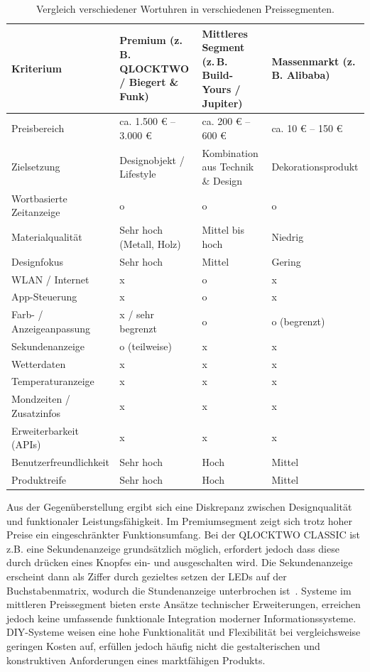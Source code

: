 \begin{table}[h]
\centering
\begin{tabular}{|p{4cm}|p{3.5cm}|p{3.5cm}|p{3.5cm}|}
\hline
\textbf{Kriterium} & \textbf{Premium (z.\,B. QLOCKTWO / Biegert \& Funk)} & \textbf{Mittleres Segment (z.\,B. Build-Yours / Jupiter)} & \textbf{Massenmarkt (z.\,B. Alibaba)} \\
\hline
Preisbereich & ca. 1.500 € – 3.000 € & ca. 200 € – 600 € & ca. 10 € – 150 € \\
\hline
Zielsetzung & Designobjekt / Lifestyle & Kombination aus Technik \& Design & Dekorationsprodukt \\
\hline
Wortbasierte Zeitanzeige & o & o & o \\
\hline
Materialqualität & Sehr hoch (Metall, Holz) & Mittel bis hoch & Niedrig \\
\hline
Designfokus & Sehr hoch & Mittel & Gering \\
\hline
WLAN / Internet & x & o & x \\
\hline
App-Steuerung & x & o & x \\
\hline
Farb- / Anzeigeanpassung & x / sehr begrenzt & o & o (begrenzt) \\
\hline
Sekundenanzeige & o (teilweise) & x & x \\
\hline
Wetterdaten & x & x & x \\
\hline
Temperaturanzeige & x & x & x \\
\hline
Mondzeiten / Zusatzinfos & x & x & x \\
\hline
Erweiterbarkeit (APIs) & x & x & x \\
\hline
Benutzerfreundlichkeit & Sehr hoch & Hoch & Mittel \\
\hline
Produktreife & Sehr hoch & Hoch & Mittel \\
\hline
\end{tabular}
\caption{Vergleich verschiedener Wortuhren in verschiedenen Preissegmenten.}
\label{tab:vergleich_wordclock_ohne_diy}
\end{table}

Aus der Gegenüberstellung ergibt sich eine Diskrepanz zwischen Designqualität und funktionaler Leistungsfähigkeit. 
Im Premiumsegment zeigt sich trotz hoher Preise ein eingeschränkter Funktionsumfang.
Bei der QLOCKTWO CLASSIC ist z.B. eine Sekundenanzeige grundsätzlich möglich, erfordert jedoch dass diese durch drücken eines Knopfes ein- und ausgeschalten wird.
Die Sekundenanzeige erscheint dann als Ziffer durch gezieltes setzen der LEDs auf der Buchstabenmatrix, wodurch die Stundenanzeige unterbrochen ist~\cite{QlockTwoClassicSekundenanzeige}. 
Systeme im mittleren Preissegment bieten erste Ansätze technischer Erweiterungen, erreichen jedoch keine umfassende funktionale Integration moderner Informationssysteme. 
DIY-Systeme weisen eine hohe Funktionalität und Flexibilität bei vergleichsweise geringen Kosten auf, erfüllen jedoch häufig nicht die gestalterischen und konstruktiven Anforderungen eines marktfähigen Produkts.